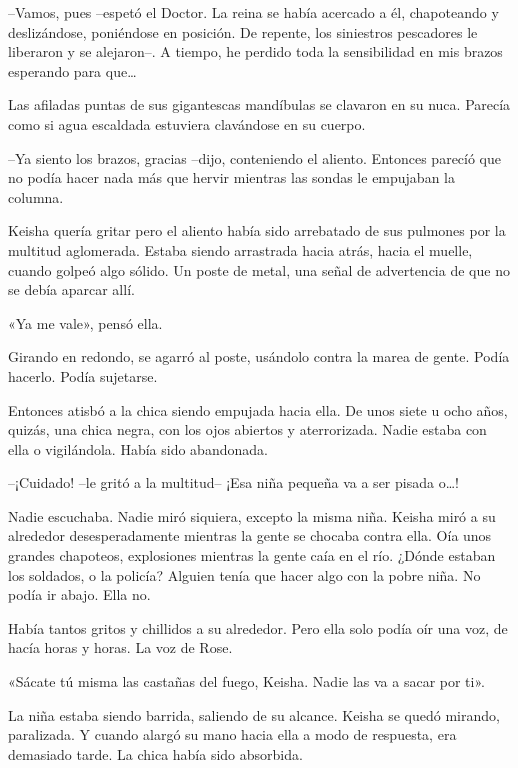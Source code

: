 \mbox{}

{--Vamos, pues --espetó el Doctor. La reina se había acercado a él,
 chapoteando y deslizándose, poniéndose en posición. De repente, los
 siniestros pescadores le liberaron y se alejaron--. A tiempo, he perdido
 toda la sensibilidad en mis brazos esperando para que\ldots{}}

{Las afiladas puntas de sus gigantescas mandíbulas se clavaron en su
nuca. Parecía como si agua escaldada estuviera clavándose en su cuerpo.}

{--Ya siento los brazos, gracias --dijo, conteniendo el aliento.
 Entonces parecíó que no podía hacer nada más que hervir mientras las
sondas le empujaban la columna.}

\mbox{}

{Keisha quería gritar pero el aliento había sido arrebatado de sus
 pulmones por la multitud aglomerada. Estaba siendo arrastrada hacia
 atrás, hacia el muelle, cuando golpeó algo sólido. Un poste de metal,
una señal de advertencia de que no se debía aparcar allí.}

{«Ya me vale», pensó ella.}

{Girando en redondo, se agarró al poste, usándolo contra la marea de
gente. Podía hacerlo. Podía sujetarse.}

{Entonces atisbó a la chica siendo empujada hacia ella. De unos siete u
 ocho años, quizás, una chica negra, con los ojos abiertos y
 aterrorizada. Nadie estaba con ella o vigilándola. Había sido
abandonada.}

{--¡Cuidado! --le gritó a la multitud-- ¡Esa niña pequeña va a ser
 pisada o\ldots{}!}

{Nadie escuchaba. Nadie miró siquiera, excepto la misma niña. Keisha
 miró a su alrededor desesperadamente mientras la gente se chocaba contra
 ella. Oía unos grandes chapoteos, explosiones mientras la gente caía en
 el río. ¿Dónde estaban los soldados, o la policía? Alguien tenía que
hacer algo con la pobre niña. No podía ir abajo. Ella no.}

{Había tantos gritos y chillidos a su alrededor. Pero ella solo podía
oír una voz, de hacía horas y horas. La voz de Rose.}

{«Sácate tú misma las castañas del fuego, Keisha. Nadie las va a sacar
por ti».}

{La niña estaba siendo barrida, saliendo de su alcance. Keisha se quedó
 mirando, paralizada. Y cuando alargó su mano hacia ella a modo de
respuesta, era demasiado tarde. La chica había sido absorbida.}

